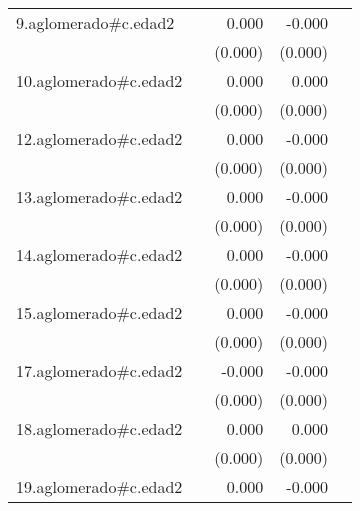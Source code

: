 {\begin{longtable}{l*{4}{D{.}{.}{-1}}}
\addlinespace
9.aglomerado#c.edad2&                     &       0.000         &      -0.000\sym{*}  &                     \\
            &                     &     (0.000)         &     (0.000)         &                     \\
\addlinespace
10.aglomerado#c.edad2&                     &       0.000         &       0.000         &                     \\
            &                     &     (0.000)         &     (0.000)         &                     \\
\addlinespace
12.aglomerado#c.edad2&                     &       0.000         &      -0.000         &                     \\
            &                     &     (0.000)         &     (0.000)         &                     \\
\addlinespace
13.aglomerado#c.edad2&                     &       0.000         &      -0.000         &                     \\
            &                     &     (0.000)         &     (0.000)         &                     \\
\addlinespace
14.aglomerado#c.edad2&                     &       0.000         &      -0.000         &                     \\
            &                     &     (0.000)         &     (0.000)         &                     \\
\addlinespace
15.aglomerado#c.edad2&                     &       0.000         &      -0.000         &                     \\
            &                     &     (0.000)         &     (0.000)         &                     \\
\addlinespace
17.aglomerado#c.edad2&                     &      -0.000         &      -0.000\sym{***}&                     \\
            &                     &     (0.000)         &     (0.000)         &                     \\
\addlinespace
18.aglomerado#c.edad2&                     &       0.000\sym{*}  &       0.000         &                     \\
            &                     &     (0.000)         &     (0.000)         &                     \\
\addlinespace
19.aglomerado#c.edad2&                     &       0.000         &      -0.000         &                     \\

\end{longtable}}
